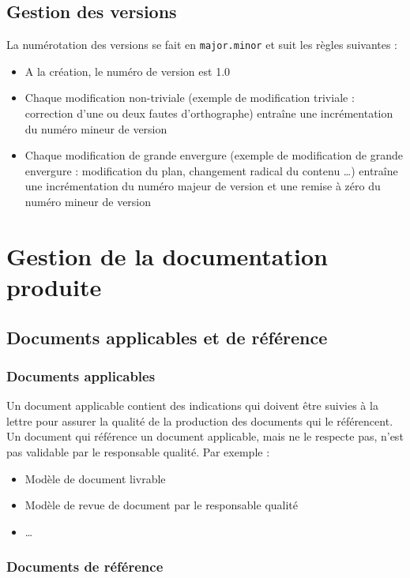 \section{Gestion des versions}

La numérotation des versions se fait en \verb|major.minor| et suit les règles suivantes :
\begin{itemize}
\item A la création, le numéro de version est 1.0
\item Chaque modification non-triviale (exemple de modification triviale : correction d'une ou deux fautes d'orthographe) entraîne une incrémentation du numéro mineur de version
\item Chaque modification de grande envergure (exemple de modification de grande envergure : modification du plan, changement radical du contenu \ldots) entraîne une incrémentation du numéro majeur de version et une remise à zéro du numéro mineur de version
\end{itemize}

\chapter{Gestion de la documentation produite}

\section{Documents applicables et de référence}

\subsection{Documents applicables}

Un document applicable contient des indications qui doivent être suivies à la lettre pour assurer la qualité de la production des documents qui le référencent. Un document qui référence un document applicable, mais ne le respecte pas, n'est pas validable par le responsable qualité. Par exemple :
\begin{itemize}
\item Modèle de document livrable
\item Modèle de revue de document par le responsable qualité
\item \ldots
\end{itemize}

\subsection{Documents de référence}

